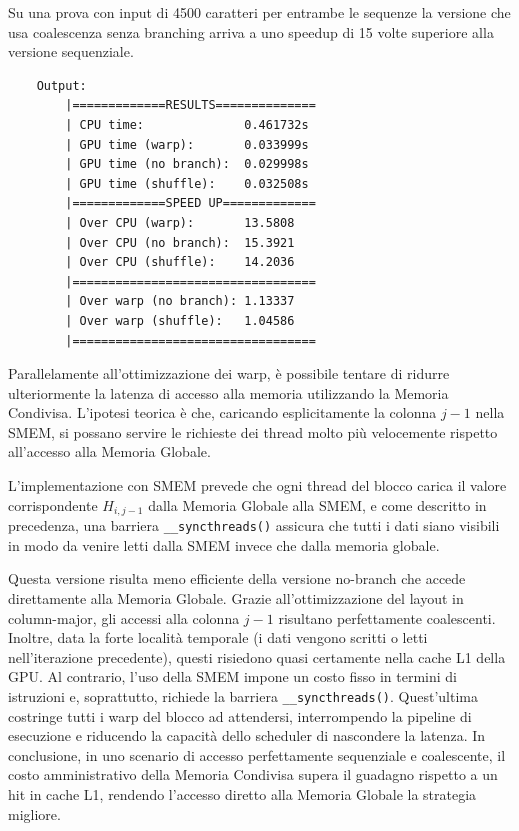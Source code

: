 \documentclass[a4paper,12pt]{article}
\begin{document}
Su una prova con input di 4500 caratteri per entrambe le sequenze la versione che usa coalescenza senza branching arriva a uno speedup di 15 volte superiore alla versione sequenziale.
\begin{lstlisting}
    Output:
        |=============RESULTS==============
        | CPU time:              0.461732s
        | GPU time (warp):       0.033999s
        | GPU time (no branch):  0.029998s
        | GPU time (shuffle):    0.032508s
        |=============SPEED UP=============
        | Over CPU (warp):       13.5808
        | Over CPU (no branch):  15.3921
        | Over CPU (shuffle):    14.2036
        |==================================
        | Over warp (no branch): 1.13337
        | Over warp (shuffle):   1.04586
        |==================================
\end{lstlisting}

Parallelamente all'ottimizzazione dei warp, è possibile tentare di ridurre ulteriormente la latenza di accesso alla memoria utilizzando la Memoria Condivisa. L'ipotesi teorica è che, caricando esplicitamente la colonna $j-1$ nella SMEM, si possano servire le richieste dei thread molto più velocemente rispetto all'accesso alla Memoria Globale.

L'implementazione con SMEM prevede che ogni thread del blocco carica il valore corrispondente $H_{i, j-1}$ dalla Memoria Globale alla SMEM, e come descritto in precedenza, una barriera \texttt{\_\_syncthreads()} assicura che tutti i dati siano visibili in modo da venire letti dalla SMEM invece che dalla memoria globale.

Questa versione risulta meno efficiente della versione no-branch che accede direttamente alla Memoria Globale.
Grazie all'ottimizzazione del layout in column-major, gli accessi alla colonna $j-1$ risultano perfettamente coalescenti. Inoltre, data la forte località temporale (i dati vengono scritti o letti nell'iterazione precedente), questi risiedono quasi certamente nella cache L1 della GPU. Al contrario, l'uso della SMEM impone un costo fisso in termini di istruzioni e, soprattutto, richiede la barriera \texttt{\_\_syncthreads()}. Quest'ultima costringe tutti i warp del blocco ad attendersi, interrompendo la pipeline di esecuzione e riducendo la capacità dello scheduler di nascondere la latenza.
In conclusione, in uno scenario di accesso perfettamente sequenziale e coalescente, il costo amministrativo della Memoria Condivisa supera il guadagno rispetto a un hit in cache L1, rendendo l'accesso diretto alla Memoria Globale la strategia migliore.
\end{document}
